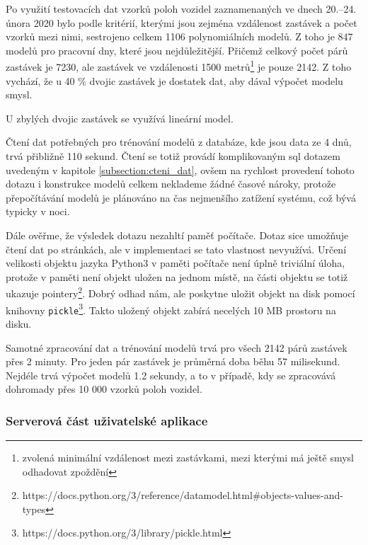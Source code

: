 Po využití testovacích dat vzorků poloh vozidel zaznamenaných ve dnech 20.--24. února 2020 bylo podle kritérií, kterými jsou zejména vzdálenost zastávek a počet vzorků mezi nimi, sestrojeno celkem 1106 polynomiálních modelů. Z toho je 847 modelů pro pracovní dny, které jsou nejdůležitější. Přičemž celkový počet párů zastávek je 7230, ale zastávek ve vzdálenosti 1500 metrů\footnote{zvolená minimální vzdálenost mezi zastávkami, mezi kterými má ještě smysl odhadovat zpoždění} je pouze 2142. Z toho vychází, že u 40 \% dvojic zastávek je dostatek dat, aby dával výpočet modelu smysl.


\bigbreak


U zbylých dvojic zastávek se využívá lineární model.


\bigbreak


Čtení dat potřebných pro trénování modelů z databáze, kde jsou data ze 4 dnů, trvá přibližně 110 sekund. Čtení se totiž provádí komplikovaným \gls{sql} dotazem uvedeným v kapitole \ref{subsection:cteni_dat}, ovšem na rychlost provedení tohoto dotazu i konstrukce modelů celkem neklademe žádné časové nároky, protože přepočítávání modelů je plánováno na čas nejmenšího zatížení systému, což bývá typicky v noci.

\bigbreak


Dále ověřme, že výsledek dotazu nezahltí paměť počítače. Dotaz sice umožňuje čtení dat po stránkách, ale v implementaci se tato vlastnost nevyužívá. Určení velikosti objektu jazyka Python3 v paměti počítače není úplně triviální úloha, protože v paměti není objekt uložen na jednom místě, na části objektu se totiž ukazuje pointery\footnote{https://docs.python.org/3/reference/datamodel.html\#objects-values-and-types}. Dobrý odhad nám, ale poskytne uložit objekt na disk pomocí knihovny \verb-pickle-\footnote{https://docs.python.org/3/library/pickle.html}. Takto uložený objekt zabírá necelých 10 MB prostoru na disku.


\bigbreak


Samotné zpracování dat a trénování modelů trvá pro všech 2142 párů zastávek přes 2 minuty. Pro jeden pár zastávek je průměrná doba běhu 57 milisekund. Nejdéle trvá výpočet modelů 1.2 sekundy, a to v případě, kdy se zpracovává dohromady přes 10 000 vzorků poloh vozidel.


\subsubsection{Serverová část uživatelské aplikace}


